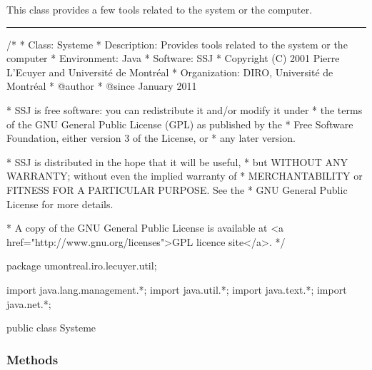 
This class provides a few tools related to the system
or the computer.




\bigskip\hrule

\begin{code}\begin{hide}
/*
 * Class:        Systeme
 * Description:  Provides tools related to the system or the computer
 * Environment:  Java
 * Software:     SSJ 
 * Copyright (C) 2001  Pierre L'Ecuyer and Université de Montréal
 * Organization: DIRO, Université de Montréal
 * @author       
 * @since        January 2011

 * SSJ is free software: you can redistribute it and/or modify it under
 * the terms of the GNU General Public License (GPL) as published by the
 * Free Software Foundation, either version 3 of the License, or
 * any later version.

 * SSJ is distributed in the hope that it will be useful,
 * but WITHOUT ANY WARRANTY; without even the implied warranty of
 * MERCHANTABILITY or FITNESS FOR A PARTICULAR PURPOSE.  See the
 * GNU General Public License for more details.

 * A copy of the GNU General Public License is available at
   <a href="http://www.gnu.org/licenses">GPL licence site</a>.
 */
\end{hide}
package umontreal.iro.lecuyer.util;\begin{hide}
   import java.lang.management.*;
   import java.util.*;
   import java.text.*;
   import java.net.*;
\end{hide}


public class Systeme\begin{hide} {
   private Systeme() {}
\end{hide}
\end{code}

\subsubsection* {Methods}

